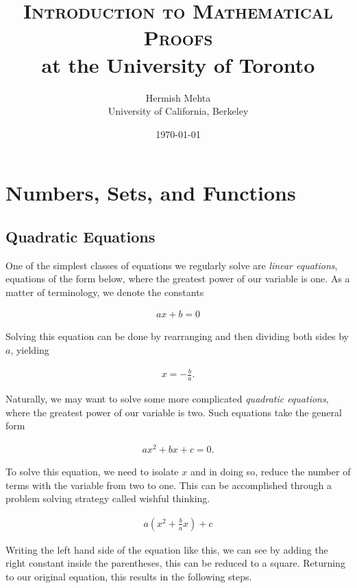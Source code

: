\documentclass[twoside]{report}
\begin{document}
\title{\textsc{Introduction to Mathematical Proofs} \\
	\large at the University of Toronto}
\author{Hermish Mehta \\ University of California, Berkeley}
\date{\today}
\maketitle

\tableofcontents

\chapter{Numbers, Sets, and Functions}
\section{Quadratic Equations}
One of the simplest classes of equations we regularly solve are \emph{linear equations},  equations of the form below, where the greatest power of our variable is one. As a matter of terminology, we denote the constants 

\begin{align}
	ax + b = 0 	
\end{align}

Solving this equation can be done by rearranging and then dividing both sides by $a$, yielding

\begin{align*}
	x = -\frac{b}{a}.
\end{align*}

Naturally, we may want to solve some more complicated \textit{quadratic equations},  where the greatest power of our variable is two. Such equations take the general form

\begin{align}
	ax^2 + bx + c = 0.
\end{align}

To solve this equation, we need to isolate $x$ and in doing so, reduce the number of terms with the variable from two to one. This can be accomplished through a problem solving strategy called wishful thinking.

\begin{align*}
	a \left( x^2 + \frac{b}{a}x \right) + c
\end{align*}

Writing the left hand side of the equation like this, we can see by adding the right constant inside the parentheses, this can be reduced to a square. Returning to our original equation, this results in the following steps.
\end{document}
